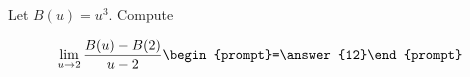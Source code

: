 \documentclass{ximera}
\author{Bart Snapp}
\begin{document}
\begin{exercise}
Let $B(u) = u^3$. Compute

\[
\lim_{ u\to 2 } 
\frac{B(u)-B(2)}{u-2} \begin{prompt}=\answer{12}\end{prompt}
\]
\end{exercise}
\end{document}
